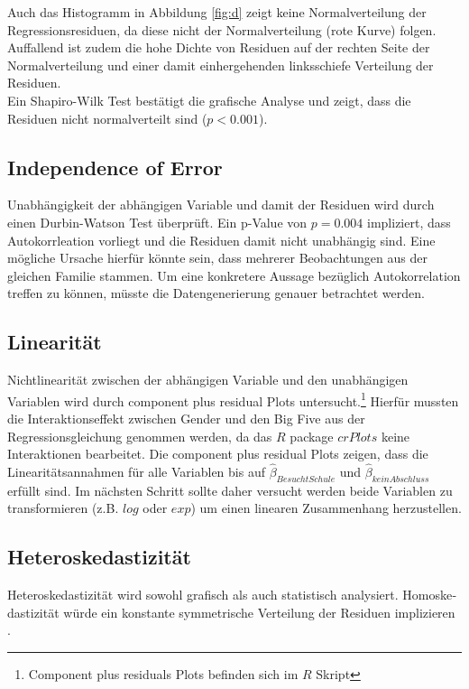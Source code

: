 \documentclass[11pt,a4paper]{article}
\begin{document}
Auch das Histogramm in Abbildung \ref{fig:d} zeigt keine Normalverteilung der Regressionsresiduen, da diese nicht der Normalverteilung (rote Kurve) folgen. Auffallend ist zudem die hohe Dichte von Residuen auf der rechten Seite der Normalverteilung und einer damit einhergehenden linksschiefe Verteilung der Residuen.\\  

Ein Shapiro-Wilk Test bestätigt die grafische Analyse und zeigt, dass die Residuen nicht normalverteilt sind ($p < 0.001$).


\subsection{Independence of Error}
Unabhängigkeit der abhängigen Variable und damit der Residuen wird durch einen Durbin-Watson Test überprüft. Ein p-Value von $p = 0.004$ impliziert, dass Autokorrleation vorliegt und die Residuen damit nicht unabhängig sind. Eine mögliche Ursache hierfür könnte sein, dass mehrerer Beobachtungen aus der gleichen Familie stammen. Um eine konkretere Aussage bezüglich Autokorrelation treffen zu können, müsste die Datengenerierung genauer betrachtet werden. 


\subsection{Linearität}
Nichtlinearität zwischen der abhängigen Variable und den unabhängigen Variablen wird durch component plus residual Plots untersucht.\footnote{Component plus residuals Plots befinden sich im $R$ Skript} Hierfür mussten die Interaktionseffekt zwischen Gender und den Big Five aus der Regressionsgleichung genommen werden, da das $R$ package $crPlots$ keine Interaktionen bearbeitet. Die component plus residual Plots zeigen, dass die Linearitätsannahmen für alle Variablen bis auf $\hat{\beta}_{Besucht Schule}$ und $\hat{\beta}_{kein Abschluss}$ erfüllt sind. Im nächsten Schritt sollte daher versucht werden beide Variablen zu transformieren (z.B. $log$ oder $exp$) um einen linearen Zusammenhang herzustellen. 


\subsection{Heteroskedastizität}
He­te­ro­s­ke­das­ti­zi­tät wird sowohl grafisch als auch statistisch analysiert. Ho­mo­s­ke­das­ti­zi­tät würde ein konstante symmetrische Verteilung der Residuen implizieren \parencite{faraway2014linear}. 
\end{document}
